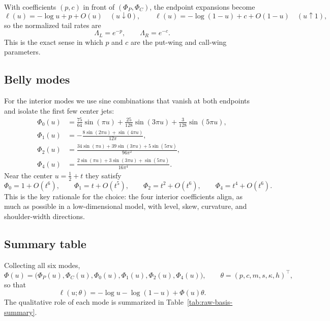 \documentclass[11pt]{article}
\begin{document}
With coefficients $(p,c)$ in front of $(\Phi_P,\Phi_C)$, the endpoint expansions become
\[
\ell(u) = -\log u + p + O(u) \quad (u \downarrow 0),
\qquad
\ell(u) = -\log(1-u) + c + O(1-u) \quad (u \uparrow 1),
\]
so the normalized tail rates are
\begin{equation}
\Lambda_L = e^{-p},
\qquad
\Lambda_R = e^{-c}.
\label{eq:tail-rates}
\end{equation}
This is the exact sense in which $p$ and $c$ are the put-wing and call-wing parameters.

\subsection{Belly modes}
For the interior modes we use sine combinations that vanish at both endpoints and isolate the first few center jets:
\begin{align}
\Phi_0(u)
&= \frac{75}{64}\sin(\pi u) + \frac{25}{128}\sin(3\pi u) + \frac{3}{128}\sin(5\pi u), \\
\Phi_1(u)
&= -\frac{8\sin(2\pi u) + \sin(4\pi u)}{12\pi}, \\
\Phi_2(u)
&= \frac{34\sin(\pi u) + 39\sin(3\pi u) + 5\sin(5\pi u)}{96\pi^2}, \\
\Phi_4(u)
&= \frac{2\sin(\pi u) + 3\sin(3\pi u) + \sin(5\pi u)}{16\pi^4}.
\end{align}
Near the center $u = \tfrac12 + t$ they satisfy
\begin{equation}
\Phi_0 = 1 + O(t^6),
\qquad
\Phi_1 = t + O(t^5),
\qquad
\Phi_2 = t^2 + O(t^6),
\qquad
\Phi_4 = t^4 + O(t^6).
\label{eq:center-jets}
\end{equation}
This is the key rationale for the choice: the four interior coefficients align, as much as possible in a low-dimensional model, with level, skew, curvature, and shoulder-width directions.

\subsection{Summary table}
Collecting all six modes,
\[
\Phi(u) = \bigl(\Phi_P(u),\Phi_C(u),\Phi_0(u),\Phi_1(u),\Phi_2(u),\Phi_4(u)\bigr),
\qquad
\theta = (p,c,m,s,\kappa,h)^\top,
\]
so that
\[
\ell(u;\theta) = -\log u - \log(1-u) + \Phi(u)\theta.
\]
The qualitative role of each mode is summarized in Table~\ref{tab:raw-basis-summary}.
\end{document}
